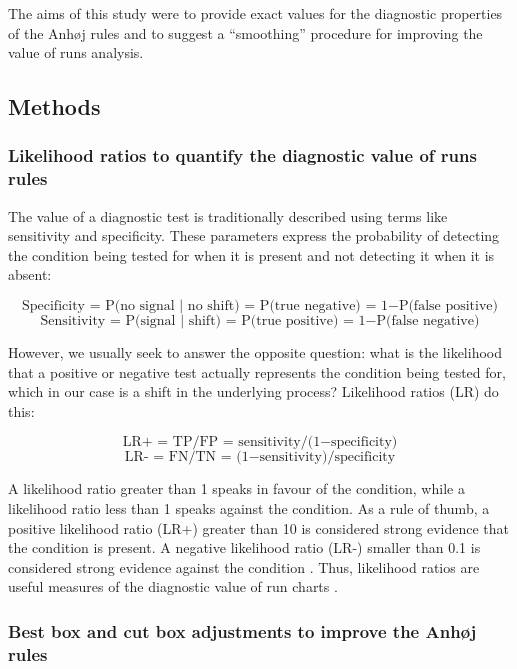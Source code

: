 The aims of this study were to provide exact values for the diagnostic
properties of the Anhøj rules and to suggest a ``smoothing'' procedure
for improving the value of runs analysis.

\hypertarget{methods}{%
\subsection{Methods}\label{methods}}

\hypertarget{likelihood-ratios-to-quantify-the-diagnostic-value-of-runs-rules}{%
\subsubsection{Likelihood ratios to quantify the diagnostic value of
runs
rules}\label{likelihood-ratios-to-quantify-the-diagnostic-value-of-runs-rules}}

The value of a diagnostic test is traditionally described using terms
like sensitivity and specificity. These parameters express the
probability of detecting the condition being tested for when it is
present and not detecting it when it is absent:

\[ \text{Specificity = P(no signal | no shift) = P(true negative) = 1} - \text{P(false positive)} \]
\[ \text{Sensitivity = P(signal | shift) = P(true positive) = 1} - \text{P(false negative)} \]

However, we usually seek to answer the opposite question: what is the
likelihood that a positive or negative test actually represents the
condition being tested for, which in our case is a shift in the
underlying process? Likelihood ratios (LR) do this:

\[ \text{LR+ = TP/FP = sensitivity/(1} - \text{specificity)} \]
\[ \text{LR- = FN/TN = (1} - \text{sensitivity)/specificity} \]

A likelihood ratio greater than 1 speaks in favour of the condition,
while a likelihood ratio less than 1 speaks against the condition. As a
rule of thumb, a positive likelihood ratio (LR+) greater than 10 is
considered strong evidence that the condition is present. A negative
likelihood ratio (LR-) smaller than 0.1 is considered strong evidence
against the condition \citep{deeks2004}. Thus, likelihood ratios are
useful measures of the diagnostic value of run charts
\citep{anhoej2015, anhoej2018}.

\hypertarget{best-box-and-cut-box-adjustments-to-improve-the-anhj-rules}{%
\subsubsection{Best box and cut box adjustments to improve the Anhøj
rules}\label{best-box-and-cut-box-adjustments-to-improve-the-anhj-rules}}

